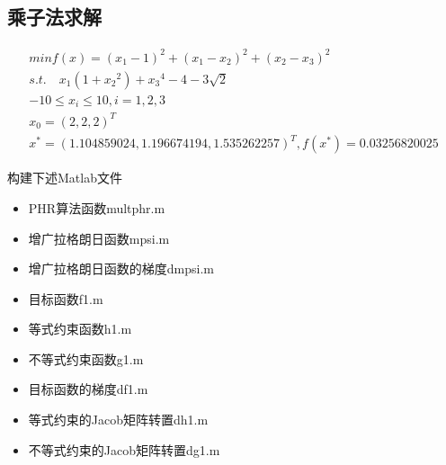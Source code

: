 \documentclass[12pt]{article} %
\begin{document}
	\subsection{乘子法求解}
	\begin{gather*}
	min f(x)=(x_1-1)^2+(x_1-x_2)^2+(x_2-x_3)^2\\
	s.t.\quad x_1(1+{x_2}^2)+{x_3}^4-4-3\sqrt{2}\\
	-10\le x_i\le10,i=1,2,3\\
	x_0=(2,2,2)^T\\
	x^*=(1.104859024,1.196674194,1.535262257)^T,f(x^*)=0.03256820025
	\end{gather*}
	
	构建下述Matlab文件
	\begin{itemize}
		\item PHR算法函数multphr.m
		\item 增广拉格朗日函数mpsi.m
		\item 增广拉格朗日函数的梯度dmpsi.m
		\item 目标函数f1.m
		\item 等式约束函数h1.m
		\item 不等式约束函数g1.m
		\item 目标函数的梯度df1.m
		\item 等式约束的Jacob矩阵转置dh1.m
		\item 不等式约束的Jacob矩阵转置dg1.m
	\end{itemize}
\end{document}
